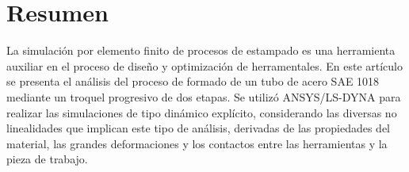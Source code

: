 \chapter*{Resumen}


La simulación por elemento finito de procesos de estampado es una herramienta auxiliar en el 
proceso de diseño y optimización de herramentales. En este artículo se presenta el análisis 
del proceso de formado de un tubo de acero SAE 1018 mediante un troquel progresivo de dos etapas. 
Se utilizó ANSYS/LS-DYNA para realizar las simulaciones de tipo dinámico explícito, considerando 
las diversas no linealidades que implican este tipo de análisis, derivadas de las propiedades 
del material, las grandes deformaciones y los contactos entre las herramientas y la pieza de trabajo. 